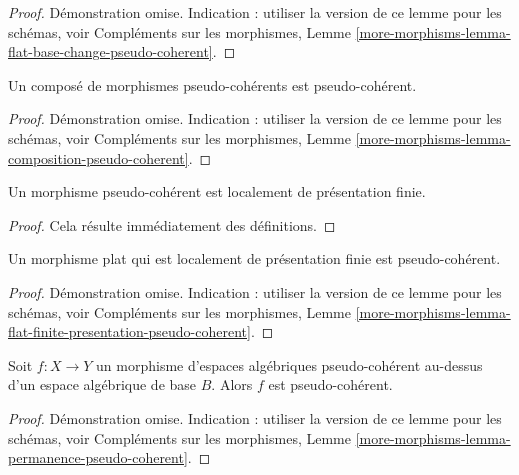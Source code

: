\begin{proof}
Démonstration omise. Indication : utiliser la version de ce lemme pour les schémas, voir
Compléments sur les morphismes,
Lemme \ref{more-morphisms-lemma-flat-base-change-pseudo-coherent}.
\end{proof}

\begin{lemma}
\label{lemma-composition-pseudo-coherent}
Un composé de morphismes pseudo-cohérents est pseudo-cohérent.
\end{lemma}

\begin{proof}
Démonstration omise. Indication : utiliser la version de ce lemme pour les schémas, voir
Compléments sur les morphismes,
Lemme \ref{more-morphisms-lemma-composition-pseudo-coherent}.
\end{proof}

\begin{lemma}
\label{lemma-pseudo-coherent-finite-presentation}
Un morphisme pseudo-cohérent est localement de présentation finie.
\end{lemma}

\begin{proof}
Cela résulte immédiatement des définitions.
\end{proof}

\begin{lemma}
\label{lemma-flat-finite-presentation-pseudo-coherent}
Un morphisme plat qui est localement de présentation finie est pseudo-cohérent.
\end{lemma}

\begin{proof}
Démonstration omise. Indication : utiliser la version de ce lemme pour les schémas, voir
Compléments sur les morphismes,
Lemme \ref{more-morphisms-lemma-flat-finite-presentation-pseudo-coherent}.
\end{proof}

\begin{lemma}
\label{lemma-permanence-pseudo-coherent}
Soit $f : X \to Y$ un morphisme d'espaces algébriques pseudo-cohérent
au-dessus d'un espace algébrique de base $B$. Alors $f$ est pseudo-cohérent.
\end{lemma}

\begin{proof}
Démonstration omise. Indication : utiliser la version de ce lemme pour les schémas, voir
Compléments sur les morphismes,
Lemme \ref{more-morphisms-lemma-permanence-pseudo-coherent}.
\end{proof}

